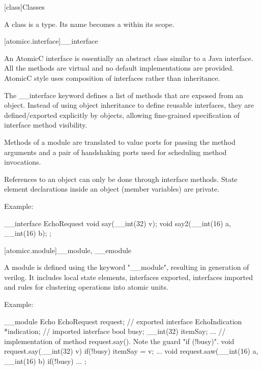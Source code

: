 [class]{Classes}%


\pnum
A class is a type.
Its name becomes a  within its
scope.

\begin{bnf}
\br
     \br
     \br
\end{bnf}

[atomicc.interface]{__interface}

An AtomicC interface is essentially an abstract class similar to a
Java interface. All the methods are virtual and no default
implementations are provided. AtomicC style uses composition of
interfaces rather than inheritance.

The __interface keyword defines a list of methods that are exposed from an object.
Instead of using object inheritance to define reusable interfaces,
they are defined/exported explicitly by objects, allowing fine-grained
specification of interface method visibility.

Methods of a module are translated to value ports for passing the
method arguments and a pair of handshaking ports used for scheduling
method invocations.

References to an object can only be done through interface methods.  State element
declarations inside an object (member variables) are private.

Example:
\begin{codeblock}
     __interface EchoRequest {
         void say(__int(32) v);
         void say2(__int(16) a, __int(16) b);
     };
\end{codeblock}

[atomicc.module]{__module, __emodule}

A module is defined using the keyword "__module", resulting in generation of verilog.
It includes local state elements, interfaces exported, interfaces imported
and rules for clustering operations into atomic units.

Example:
\begin{codeblock}
     __module Echo {
         EchoRequest      request;               // exported interface
         EchoIndication   *indication;           // imported interface
         bool busy;
         __int(32) itemSay;
         ...
         // implementation of method request.say(). Note the guard "if (!busy)".
         void request.say(__int(32) v) if(!busy) {
             itemSay = v;
             ...
         }
         void request.saw(__int(16) a, __int(16) b) if(!busy) {
             ...
         }
     };
\end{codeblock}

